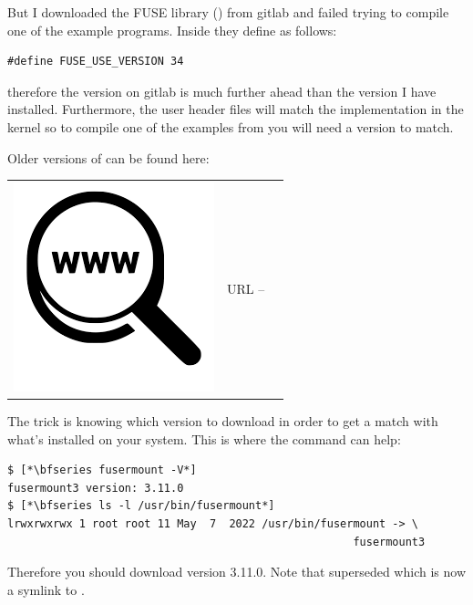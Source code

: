 \noindent
But I downloaded the FUSE library () from gitlab and failed trying to compile one of the example programs. Inside  they define  as follows:

\begin{lstlisting}
#define FUSE_USE_VERSION 34
\end{lstlisting}

\noindent
therefore the  version on gitlab is much further ahead than the version I have installed. Furthermore, the user header files will match the implementation in the kernel so to compile one of the examples from  you will need a version to match.

Older versions of  can be found here:

\begin{table}[h]
\begin{tabular}{lcl}
\parbox[r]{0.5in}{\includegraphics[scale=0.15]{figures/url.png}} & \parbox[l]{0.55in}{URL  -- } & \parbox[l]{3in}{}
\end{tabular}
\end{table}

\noindent
The trick is knowing which version to download in order to get a match with what's installed on your system. This is where the  command can help:

\begin{lstlisting}
$ [*\bfseries fusermount -V*]
fusermount3 version: 3.11.0
$ [*\bfseries ls -l /usr/bin/fusermount*]
lrwxrwxrwx 1 root root 11 May  7  2022 /usr/bin/fusermount -> \
                                                     fusermount3
\end{lstlisting}

\noindent
Therefore you should download  version 3.11.0. Note that  superseded  which is now a symlink to  .

